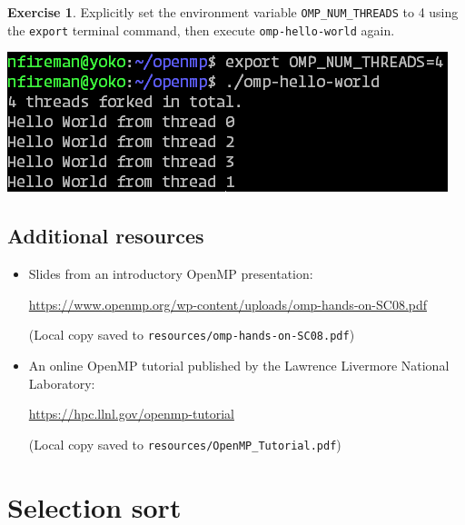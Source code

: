 \documentclass{article}
\newcommand{\resource}[1]{(Local copy saved to \texttt{#1})}
\theoremstyle{definition}
\newtheorem{exercise}{Exercise}
\begin{document}
\begin{exercise}
Explicitly set the environment variable \texttt{OMP\_NUM\_THREADS} to 4 using the \texttt{export} terminal command, then execute \texttt{omp-hello-world} again.

\includegraphics[width=\textwidth]{images/hello-world-export-output.png}
\end{exercise}

\subsection*{Additional resources}

\begin{itemize}
    \item Slides from an introductory OpenMP presentation:
    
    \url{https://www.openmp.org/wp-content/uploads/omp-hands-on-SC08.pdf}
    
    \resource{resources/omp-hands-on-SC08.pdf}
    
    \item An online OpenMP tutorial published by the Lawrence Livermore National Laboratory:
    
    \url{https://hpc.llnl.gov/openmp-tutorial}
    
    \resource{resources/OpenMP\_Tutorial.pdf}
\end{itemize}

\section{Selection sort}
\end{document}
